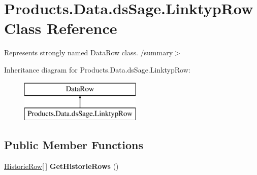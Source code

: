 \hypertarget{class_products_1_1_data_1_1ds_sage_1_1_linktyp_row}{}\section{Products.\+Data.\+ds\+Sage.\+Linktyp\+Row Class Reference}
\label{class_products_1_1_data_1_1ds_sage_1_1_linktyp_row}


Represents strongly named Data\+Row class. /summary$>$  


Inheritance diagram for Products.\+Data.\+ds\+Sage.\+Linktyp\+Row\+:\begin{figure}[H]
\begin{center}
\leavevmode
\includegraphics[height=2.000000cm]{class_products_1_1_data_1_1ds_sage_1_1_linktyp_row}
\end{center}
\end{figure}
\subsection*{Public Member Functions}
\begin{DoxyCompactItemize}
\item 
\hyperlink{class_products_1_1_data_1_1ds_sage_1_1_historie_row}{Historie\+Row}\mbox{[}$\,$\mbox{]} {\bfseries Get\+Historie\+Rows} ()\hypertarget{class_products_1_1_data_1_1ds_sage_1_1_linktyp_row_a3ed5d991898310f63e560dd936607109}{}\label{class_products_1_1_data_1_1ds_sage_1_1_linktyp_row_a3ed5d991898310f63e560dd936607109}

\end{DoxyCompactItemize}
